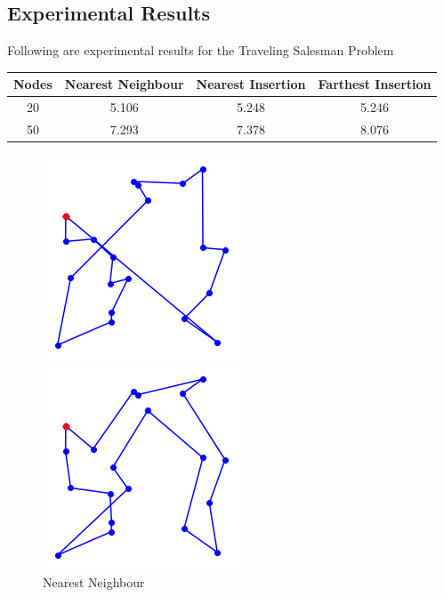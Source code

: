 \documentclass{article}
\theoremstyle{definition}
\begin{document}
\subsection{Experimental Results}
Following are experimental results for the Traveling Salesman Problem
\begin{center}
\begin{tabular}{|c|c|c|c|}
\hline
    Nodes & Nearest Neighbour &  Nearest Insertion & Farthest Insertion\\\hline
    20 & 5.106 & 5.248 & 5.246\\\hline
    50 & 7.293  & 7.378 & 8.076\\\hline
\end{tabular}
\end{center}
\begin{figure}[!htb]
  \includegraphics[width=0.7\linewidth]{images/nn20.png}
  \caption*{Nearest Neighbour}\label{fig:awesome_image1}
\endminipage\hfill
{}
  \includegraphics[width=0.7\linewidth]{images/ni20.png}

\end{figure}
\end{document}
